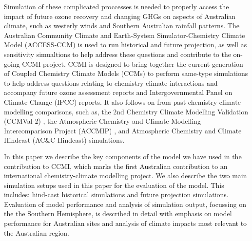 Simulation of these complicated proccesses is needed to properly access the impact of future ozone recovery and changing GHGs on aspects of Australian climate, such as westerly winds and Southern Australian rainfall patterns. The Australian Community Climate and Earth-System Simulator-Chemistry Climate Model (ACCESS-CCM) is used to run historical and future projection, as well as sensitivity simualtions to help address these questions and contribute to the on-going CCMI project. CCMI is designed to bring together the current generation of Coupled Chemistry Climate Models (CCMs) to perform same-type simulations to help address questions relating to chemistry-climate interactions and accompany future ozone assessment reports and Intergovernmental Panel on Climate Change (IPCC) reports. It also follows on from past chemistry climate modelling comparisons, such as, the 2nd Chemistry Climate Modelling Validation (CCMVal-2) \citep{CCMVal:uf}, the Atmospheric Chemistry and Climate Modelling Intercomparison Project (ACCMIP) \citep{Lamarque:2013jm}, and Atmospheric Chemistry and Climate Hindcast (AC&C Hindcast) simulations. 

In this paper we describe the key components of the model we have used in the contribution to CCMI, which marks the first Australian contribution to an international chemistry-climate modelling project. We also describe the two main simulation setups used in this paper for the evaluation of the model. This includes: hind-cast historical simulations and future projection simulations. Evaluation of model performance and analysis of simulation output, focussing on the the Southern Hemisphere, is described in detail with emphasis on model performance for Australian sites and analysis of climate impacts most relevant to the Australian region.
